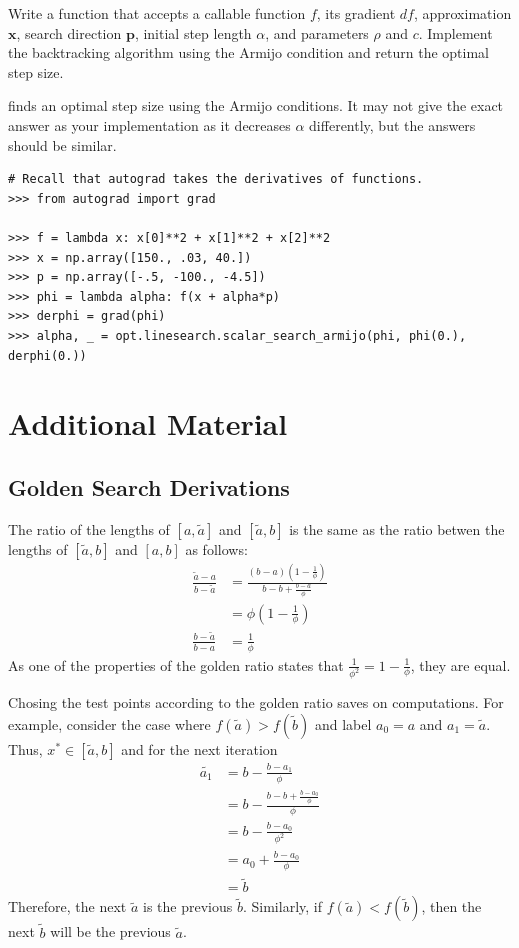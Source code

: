 \begin{problem}
Write a function that accepts a callable function $f$, its gradient $df$, approximation $\textbf{x}$, search direction $\textbf{p}$, initial step length $\alpha$, and parameters $\rho$ and $c$.
Implement the backtracking algorithm using the Armijo condition and return the optimal step size.

 finds an optimal step size using the Armijo conditions.
It may not give the exact answer as your implementation as it decreases $\alpha$ differently, but the answers should be similar.
\begin{lstlisting}
# Recall that autograd takes the derivatives of functions.
>>> from autograd import grad

>>> f = lambda x: x[0]**2 + x[1]**2 + x[2]**2
>>> x = np.array([150., .03, 40.])
>>> p = np.array([-.5, -100., -4.5])
>>> phi = lambda alpha: f(x + alpha*p)
>>> derphi = grad(phi)
>>> alpha, _ = opt.linesearch.scalar_search_armijo(phi, phi(0.), derphi(0.))

\end{lstlisting}
\end{problem}

\section*{Additional Material}

\subsection*{Golden Search Derivations}

The ratio of the lengths of $[a, \tilde{a}]$ and $[\tilde{a}, b]$ is the same as the ratio betwen the lengths of $[\tilde{a}, b]$ and $[a, b]$ as follows:
\begin{align*}
\frac{\tilde{a}-a}{b-\tilde{a}} &= \frac{(b-a)(1-\frac{1}{\phi})}{b-b+\frac{b-a}{\phi}} \\
&= \phi(1-\frac{1}{\phi}) \\
\frac{b-\tilde{a}}{b-a} &= \frac{1}{\phi}
\end{align*}
As one of the properties of the golden ratio states that $\frac{1}{\phi^2} = 1 - \frac{1}{\phi}$, they are equal.

Chosing the test points according to the golden ratio saves on computations.
For example, consider the case where $f(\tilde{a}) > f(\tilde{b})$ and label $a_0 = a$ and $a_1 = \tilde{a}$.
Thus, $x^* \in [\tilde{a}, b]$ and for the next iteration
\begin{align*}
\tilde{a_1} &= b - \frac{b - a_1}{\phi} \\
&= b - \frac{b - b + \frac{b - a_0}{\phi}}{\phi}\\
&= b - \frac{b - a_0}{\phi^2}\\
&= a_0 + \frac{b - a_0}{\phi}\\
&= \tilde{b}
\end{align*}
Therefore, the next $\tilde{a}$ is the previous $\tilde{b}$.
Similarly, if $f(\tilde{a}) < f(\tilde{b})$, then the next $\tilde{b}$ will be the previous $\tilde{a}$.